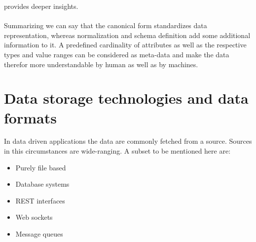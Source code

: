 provides deeper insights.
\\\\
Summarizing we can say that the canonical form standardizes data representation, whereas normalization and schema definition add some additional information to it. A predefined cardinality of attributes as well as the respective types and value ranges can be considered as meta-data and make the data therefor more understandable by human as well as by machines. 

\section{Data storage technologies and data formats\label{sec:storage}}

In data driven applications the data are commonly fetched from a source. Sources in this circumstances are wide-ranging. A subset to be mentioned here are:
\begin{itemize}
  \item Purely file based
  \item Database systems
  \item REST interfaces
  \item Web sockets
  \item Message queues\\
\end{itemize}

